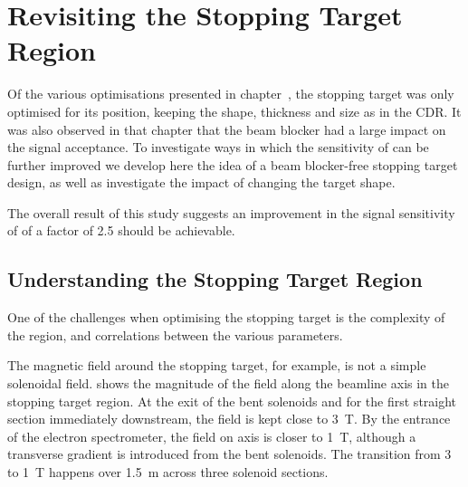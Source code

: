 
\chapter{Revisiting the Stopping Target Region}
Of the various optimisations presented in chapter~, the stopping target was only optimised for its position, keeping the shape, thickness and size as in the CDR.
It was also observed in that chapter that the beam blocker had a large impact on the signal acceptance.
To investigate ways in which the sensitivity of \phaseII can be further improved we develop here the idea of a beam blocker-free stopping target design, as well as investigate the impact of changing the target shape.

The overall result of this study suggests an improvement in the signal sensitivity of \phaseII of a factor of 2.5 should be achievable.

\section{Understanding the Stopping Target Region}
\FigTgtImprovFieldVsBeamline
\FigTgtImprovMirrorVsBeamline
\FigTgtImprovGyroradiusVsBeamline
\FigTgtImprovSenseVsBeamline
One of the challenges when optimising the stopping target is the complexity of the region, and correlations between the various parameters.

The magnetic field around the stopping target, for example, is not a simple solenoidal field.
 shows the magnitude of the field along the beamline axis in the stopping target region.
At the exit of the bent solenoids and for the first straight section immediately downstream, the field is kept close to 3~T.
By the entrance of the electron spectrometer, the field on axis is closer to 1~T, although a transverse gradient is introduced from the bent solenoids.
The transition from 3 to 1~T happens over 1.5~m across three solenoid sections.

